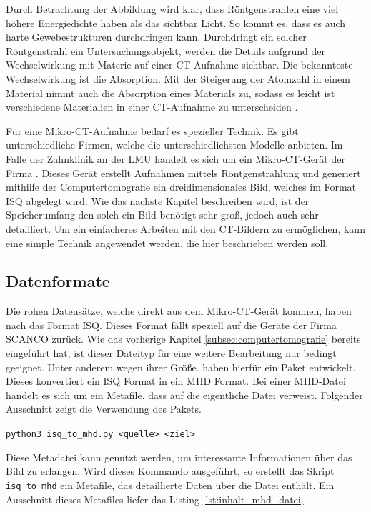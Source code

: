 Durch Betrachtung der Abbildung wird klar, dass Röntgenstrahlen eine viel höhere
Energiedichte haben als das sichtbar Licht. So kommt es, dass es auch harte
Gewebestrukturen durchdringen kann. Durchdringt ein solcher Röntgenstrahl ein Untersuchungsobjekt,
werden die Details aufgrund der Wechselwirkung mit Materie auf einer \ac{CT}-Aufnahme
sichtbar. Die bekannteste Wechselwirkung ist die Absorption. Mit der Steigerung der
Atomzahl in einem Material nimmt auch die Absorption eines Materials zu, sodass
es leicht ist verschiedene Materialien in einer \ac{CT}-Aufnahme zu unterscheiden
\citep[vgl.][K.~1]{nib2024}.

Für eine Mikro-\ac{CT}-Aufnahme bedarf es spezieller Technik. Es gibt
unterschiedliche Firmen, welche die unterschiedlichsten Modelle anbieten. Im
Falle der Zahnklinik an der \ac{LMU} handelt es sich um ein Mikro-\ac{CT}-Gerät
der Firma \citet{scanco2024}. Dieses Gerät erstellt Aufnahmen mittels
Röntgenstrahlung und generiert mithilfe der Computertomografie ein
dreidimensionales Bild, welches im Format \ac{ISQ} abgelegt wird. Wie das nächste
Kapitel beschreiben wird, ist der Speicherumfang den solch ein Bild benötigt
sehr groß, jedoch auch sehr detailliert. Um ein einfacheres Arbeiten mit den \ac{CT}-Bildern
zu ermöglichen, kann eine simple Technik angewendet werden, die hier beschrieben
werden soll.

\subsection{Datenformate}
\label{subsec:datensätze} Die rohen Datensätze, welche direkt aus dem Mikro-\ac{CT}-Gerät
kommen, haben nach \citet{scanco2024} das Format \ac{ISQ}. Dieses Format fällt speziell
auf die Geräte der Firma SCANCO zurück. Wie das vorherige Kapitel
\ref{subsec:computertomografie} bereits eingeführt hat, ist dieser Dateityp für eine
weitere Bearbeitung nur bedingt geeignet. Unter anderem wegen ihrer Größe. \citet[S.~118-119]{RoeschKunzelmann2018}
haben hierfür ein Paket entwickelt. Dieses konvertiert ein \ac{ISQ} Format in
ein \ac{MHD} Format. Bei einer \ac{MHD}-Datei handelt es sich um ein Metafile,
dass auf die eigentliche Datei verweist. Folgender Ausschnitt zeigt die Verwendung
des Pakets.
\begin{center}
	\texttt{python3 isq\_to\_mhd.py <quelle> <ziel>}
\end{center}
Diese Metadatei kann genutzt werden, um interessante Informationen über das Bild
zu erlangen. Wird dieses Kommando ausgeführt, so erstellt das Skript \texttt{isq\_to\_mhd}
ein Metafile, das detaillierte Daten über die Datei enthält. Ein Ausschnitt
dieses Metafiles liefer das Listing \ref{lst:inhalt_mhd_datei}

